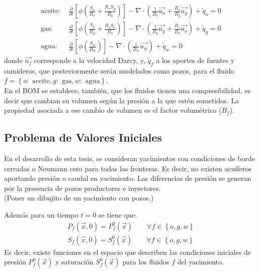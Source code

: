 \begin{align}
\label{ec:aceite}
\text{aceite: }&\frac{\partial}{\partial t} \left[ \phi \left( \frac{S_{o}}{B_{o}} + \frac{R_{v} S_{g}}{B_{g}} \right) \right]
- \nabla \cdot \left( \frac{1}{B_{o}} \vec{u_{o}} + \frac{R_{v}}{B_{g}} \vec{u_{g}} \right) + \tilde{q}_{o}=0  \\
\label{ec:gas}
\text{gas: }&\frac{\partial}{\partial t} \left[ \phi \left( \frac{S_{g}}{B_{g}} + \frac{R_{s} S_{o}}{B_{o}} \right) \right]
- \nabla \cdot \left( \frac{1}{B_{g}} \vec{u_{g}} + \frac{R_{s}}{B_{o}} \vec{u_{o}} \right) + \tilde{q}_{g} = 0 \\
\label{ec:agua}
\text{agua: }&\frac{\partial}{\partial t} \left[\phi \left( \frac{S_{w}}{B_{w}} \right) \right] - \nabla \cdot \left( \frac{1}{B_{w}} \vec{u_{w}} \right) + \tilde{q}_{w} = 0 
\end{align}
donde $\vec{u_{f}}$ corresponde a la velocidad Darcy, y, $\tilde{q}_{f}$ a los aportes de fuentes y sumideros, que posteriormente serán modelados como pozos, para el fluido $f = \left\lbrace o:\text{ aceite}, g:\text{ gas}, w:\text{ agua} \right\rbrace $.\\

En el BOM se establece, también, que los fluidos tienen una compresibilidad, es decir que cambian su volumen según la presión a la que estén sometidos. La propiedad asociada a ese cambio de volumen es el factor volumétrico ($B_{f}$).


\subsection{Problema de Valores Iniciales}

En el desarrollo de esta tesis, se consideran yacimientos con condiciones de borde cerradas o Neumann cero para todas las fronteras. Es decir, no existen acuíferos aportando presión o caudal en yacimiento. Las diferencias de presión se generan por la presencia de pozos productores e inyectores.\\

(Poner un dibujito de un yacimiento con pozos.)

Además para un tiempo $t=0$ se tiene que:
\begin{align}
	P_{f}(\vec{x},0) = P^{0}_{f}(\vec{x}) \qquad \forall f \in \left\lbrace o,g,w\right\rbrace\\
	S_{f}(\vec{x},0) = S^{0}_{f}(\vec{x}) \qquad \forall f \in \left\lbrace o,g,w\right\rbrace
\end{align}
%
Es decir, existe funciones en el espacio que describen las condiciones iniciales de presión $P^{0}_{f}(\vec{x})$ y saturación $S^{0}_{f}(\vec{x})$ para los fluidos $f$ del yacimiento.

